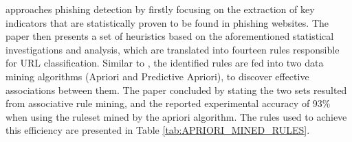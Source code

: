 \cite{INTELLIGENT_RULE_MINING} approaches phishing detection by firstly focusing on the extraction of key indicators that are statistically proven to be found in phishing websites. The paper then presents a set of heuristics based on the aforementioned statistical investigations and analysis, which are translated into fourteen rules responsible for URL classification. Similar to \cite{RULE_BASED_CLASSIFICATION}, the identified rules are fed into two data mining algorithms (Apriori and Predictive Apriori), to discover effective associations between them. The paper concluded by stating the two sets resulted from associative rule mining, and the reported experimental accuracy of 93\% when using the ruleset mined by the apriori algorithm. The rules used to achieve this efficiency are presented in Table \ref{tab:APRIORI_MINED_RULES}.


